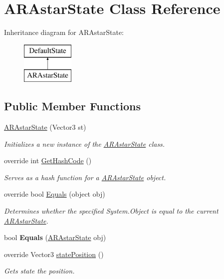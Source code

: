 \hypertarget{class_a_r_astar_state}{\section{A\-R\-Astar\-State Class Reference}
\label{class_a_r_astar_state}
}
Inheritance diagram for A\-R\-Astar\-State\-:\begin{figure}[H]
\begin{center}
\leavevmode
\includegraphics[height=2.000000cm]{class_a_r_astar_state}
\end{center}
\end{figure}
\subsection*{Public Member Functions}
\begin{DoxyCompactItemize}
\item 
\hyperlink{class_a_r_astar_state_aea1aef997b4a38111acaae49ca8b58e7}{A\-R\-Astar\-State} (Vector3 st)
\begin{DoxyCompactList}\small\item\em Initializes a new instance of the \hyperlink{class_a_r_astar_state}{A\-R\-Astar\-State} class. \end{DoxyCompactList}\item 
override int \hyperlink{class_a_r_astar_state_a56f7f9692648f1824f7fbe8b5368c888}{Get\-Hash\-Code} ()
\begin{DoxyCompactList}\small\item\em Serves as a hash function for a \hyperlink{class_a_r_astar_state}{A\-R\-Astar\-State} object. \end{DoxyCompactList}\item 
override bool \hyperlink{class_a_r_astar_state_a09e066353969e553f2f1f6eaa3c3cd49}{Equals} (object obj)
\begin{DoxyCompactList}\small\item\em Determines whether the specified System.\-Object is equal to the current \hyperlink{class_a_r_astar_state}{A\-R\-Astar\-State}. \end{DoxyCompactList}\item 
\hypertarget{class_a_r_astar_state_ac382fe20a1cdfe2a2ce15cbd377c1c09}{bool {\bfseries Equals} (\hyperlink{class_a_r_astar_state}{A\-R\-Astar\-State} obj)}\label{class_a_r_astar_state_ac382fe20a1cdfe2a2ce15cbd377c1c09}

\item 
override Vector3 \hyperlink{class_a_r_astar_state_a0c13f3ba8101aae8654660f3fea953d5}{state\-Position} ()
\begin{DoxyCompactList}\small\item\em Gets state the position. \end{DoxyCompactList}\end{DoxyCompactItemize}
